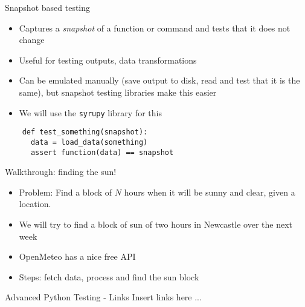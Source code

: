 \documentclass[11pt,xcolor={dvipsnames},hyperref={pdftex,pdfpagemode=UseNone,hidelinks,pdfdisplaydoctitle=true},usepdftitle=false]{beamer}
\begin{document}
\begin{frame}[fragile]{Snapshot based testing}
\label{snapshot-based-testing}
\begin{itemize}
\item
  Captures a \emph{snapshot} of a function or command and tests that it
  does not change
\item
  Useful for testing outputs, data transformations
\item
  Can be emulated manually (save output to disk, read and test that it
  is the same), but snapshot testing libraries make this easier
\item We will use the \texttt{syrupy} library for this
\end{itemize}
\begin{verbatim}
    def test_something(snapshot):
      data = load_data(something)
      assert function(data) == snapshot
\end{verbatim}
\end{frame}


\begin{frame}{Walkthrough: finding the sun!}
\label{walkthrough-finding-the-sun}
\begin{itemize}
\item
  \alert{Problem}: Find a block of $N$ hours when it will be sunny and
  clear, given a location.
\item
  We will try to find a block of sun of two hours in Newcastle over the
  next week
\item
  OpenMeteo has a nice free API
\item
  Steps: fetch data, process and find the sun block
\end{itemize}
\end{frame}

\begin{frame}{Advanced Python Testing - Links}
Insert links here ...
\end{frame}
\end{document}
